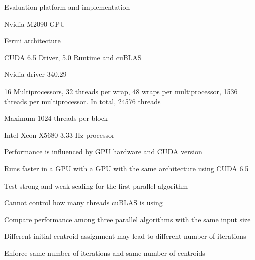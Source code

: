 \documentclass[
nopagebreaks,
style=klope,
fleqn]{powerdot}
\begin{document}
\begin{slide}{Evaluation platform and implementation}
  \footnotesize
  \begin{compactitem}
  \item{Nvidia M2090 GPU
    \begin{compactitem}
    \item{Fermi architecture}
    \item{CUDA 6.5 Driver, 5.0 Runtime and cuBLAS}
    \item{Nvidia driver 340.29}
    \item{16 Multiprocessors, 32 threads per wrap, 48 wraps per multiprocessor, 1536 threads per
      multiprocessor. In total, 24576 threads}
    \item{Maximum 1024 threads per block}
    \end{compactitem}
  }
  \item{Intel Xeon X5680 3.33 Hz processor}
  \item{Performance is influenced by GPU hardware and CUDA version
    \begin{compactitem}
    \item{Runs faster in a GPU with a GPU with the same architecture using CUDA 6.5}  
    \end{compactitem}
  }
  \item{Test strong and weak scaling for the first parallel algorithm}
  \item{Cannot control how many threads cuBLAS is using
    \begin{compactitem}
    \item{Compare performance among three parallel algorithms with the same input size}
    \end{compactitem}
  }
  \item{Different initial centroid assignment may lead to different number of iterations
    \begin{compactitem}
    \item{Enforce same number of iterations and same number of centroids}
    \end{compactitem}
  }
  \end{compactitem}
\end{slide}
\end{document}
